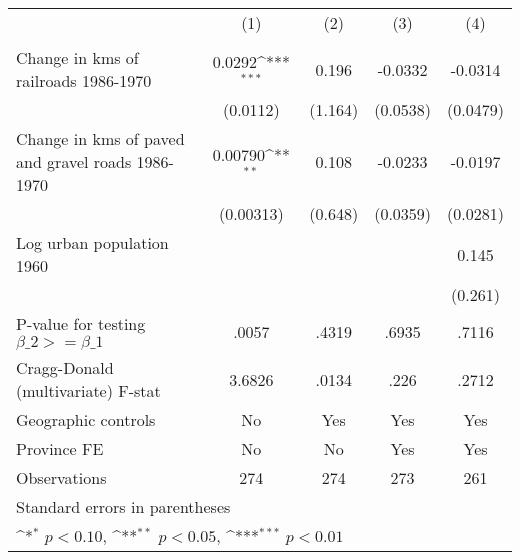 {
\def\sym#1{\ifmmode^{#1}\else\(^{#1}\)\fi}
\begin{tabular}{l*{4}{c}}
\hline\hline
                &\multicolumn{1}{c}{(1)}&\multicolumn{1}{c}{(2)}&\multicolumn{1}{c}{(3)}&\multicolumn{1}{c}{(4)}\\
                &\multicolumn{1}{c}{}&\multicolumn{1}{c}{}&\multicolumn{1}{c}{}&\multicolumn{1}{c}{}\\
\hline
Change in kms of railroads 1986-1970&   0.0292\sym{***}&    0.196         &  -0.0332         &  -0.0314         \\
                & (0.0112)         &  (1.164)         & (0.0538)         & (0.0479)         \\
[1em]
Change in kms of paved and gravel roads 1986-1970&  0.00790\sym{**} &    0.108         &  -0.0233         &  -0.0197         \\
                &(0.00313)         &  (0.648)         & (0.0359)         & (0.0281)         \\
[1em]
Log urban population 1960&                  &                  &                  &    0.145         \\
                &                  &                  &                  &  (0.261)         \\
\hline
P-value for testing $\beta\_{2} >= \beta\_{1}$&    .0057         &    .4319         &    .6935         &    .7116         \\
Cragg-Donald (multivariate) F-stat&   3.6826         &    .0134         &     .226         &    .2712         \\
Geographic controls&       No         &      Yes         &      Yes         &      Yes         \\
Province FE     &       No         &       No         &      Yes         &      Yes         \\
Observations    &      274         &      274         &      273         &      261         \\
\hline\hline
\multicolumn{5}{l}{\footnotesize Standard errors in parentheses}\\
\multicolumn{5}{l}{\footnotesize \sym{*} \(p<0.10\), \sym{**} \(p<0.05\), \sym{***} \(p<0.01\)}\\
\end{tabular}
}
